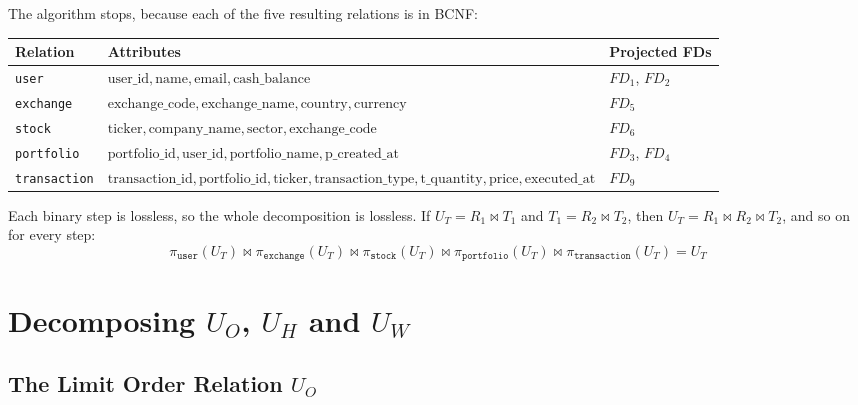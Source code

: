 \documentclass{article}
\newcommand{\at}[1]{\text{#1}}
\begin{document}
The algorithm stops, because each of the five resulting relations is in BCNF:
\begin{center}
\begin{tabular}{l l l}
  \toprule
  \textbf{Relation} & \textbf{Attributes} & \textbf{Projected FDs} \\
  \midrule
  \texttt{user} & $\at{user\_id}, \at{name}, \at{email}, \at{cash\_balance}$ & $FD_1$, $FD_2$ \\
  \texttt{exchange} & $\at{exchange\_code}, \at{exchange\_name}, \at{country}, \at{currency}$ & $FD_5$ \\
  \texttt{stock} & $\at{ticker}, \at{company\_name}, \at{sector}, \at{exchange\_code}$ & $FD_6$ \\
  \texttt{portfolio} & $\at{portfolio\_id}, \at{user\_id}, \at{portfolio\_name}, \at{p\_created\_at}$ & $FD_3$, $FD_4$ \\
  \texttt{transaction} & $\at{transaction\_id}, \at{portfolio\_id}, \at{ticker}, \at{transaction\_type}, \at{t\_quantity}, \at{price}, \at{executed\_at}$ & $FD_9$ \\
  \bottomrule
\end{tabular}
\end{center}
Each binary step is lossless, so the whole decomposition is lossless. If $U_T = R_1 \bowtie T_1$ and $T_1 = R_2 \bowtie T_2$, then $U_T = R_1 \bowtie R_2 \bowtie T_2$, and so on for every step:
\[
  \pi_{\texttt{user}}(U_T) \bowtie \pi_{\texttt{exchange}}(U_T) \bowtie \pi_{\texttt{stock}}(U_T) \bowtie \pi_{\texttt{portfolio}}(U_T) \bowtie \pi_{\texttt{transaction}}(U_T) = U_T
\]

\section{Decomposing $U_O$, $U_H$ and $U_W$}

\subsection{The Limit Order Relation $U_O$}
\end{document}
